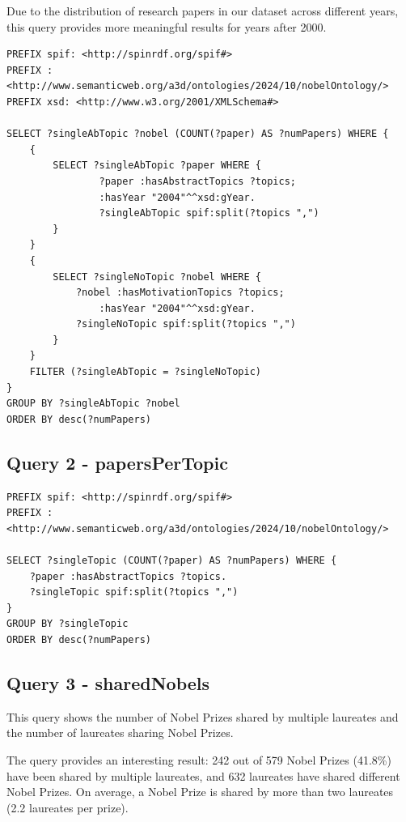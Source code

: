 \documentclass{article}
\begin{document}
Due to the distribution of research papers in our dataset across different years,
this query provides more meaningful results for years after 2000.

\begin{lstlisting}
PREFIX spif: <http://spinrdf.org/spif#>
PREFIX : <http://www.semanticweb.org/a3d/ontologies/2024/10/nobelOntology/>
PREFIX xsd: <http://www.w3.org/2001/XMLSchema#>

SELECT ?singleAbTopic ?nobel (COUNT(?paper) AS ?numPapers) WHERE {
    {
        SELECT ?singleAbTopic ?paper WHERE {
        		?paper :hasAbstractTopics ?topics;
                :hasYear "2004"^^xsd:gYear.
        		?singleAbTopic spif:split(?topics ",")
        }
    }
    {
        SELECT ?singleNoTopic ?nobel WHERE {
            ?nobel :hasMotivationTopics ?topics;
                :hasYear "2004"^^xsd:gYear.
            ?singleNoTopic spif:split(?topics ",")
        }
    }
    FILTER (?singleAbTopic = ?singleNoTopic)
}
GROUP BY ?singleAbTopic ?nobel
ORDER BY desc(?numPapers)
\end{lstlisting}

\subsection*{Query 2 - papersPerTopic}

\begin{lstlisting}
PREFIX spif: <http://spinrdf.org/spif#>
PREFIX : <http://www.semanticweb.org/a3d/ontologies/2024/10/nobelOntology/>

SELECT ?singleTopic (COUNT(?paper) AS ?numPapers) WHERE {
    ?paper :hasAbstractTopics ?topics.
    ?singleTopic spif:split(?topics ",")
}
GROUP BY ?singleTopic
ORDER BY desc(?numPapers)    
\end{lstlisting}

\subsection*{Query 3 - sharedNobels}
This query shows the number of Nobel Prizes shared by multiple laureates
and the number of laureates sharing Nobel Prizes.

\noindent The query provides an interesting result: 242 out of 579 Nobel Prizes (41.8\%) have
been shared by multiple laureates, and 632 laureates have shared different Nobel Prizes.
On average, a Nobel Prize is shared by more than two laureates (2.2 laureates per prize).

\end{document}
